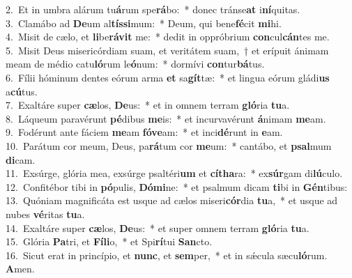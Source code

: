 {2.~}Et in umbra alárum tu\textbf{á}rum spe\textbf{rá}bo:~* donec tránse\textbf{at} i\textbf{ní}quitas.\\
{3.~}Clamábo ad \textbf{De}um al\textbf{tís}\textbf{si}mum:~* Deum, qui bene\textbf{fé}cit \textbf{mi}hi.\\
{4.~}Misit de cælo, et \textbf{li}be\textbf{rá}\textbf{vit} me:~* dedit in oppróbrium \textbf{con}cul\textbf{cán}tes me.\\
{5.~}Misit Deus misericórdiam suam, et veritátem suam,~† et erípuit ánimam meam de médio catu\textbf{ló}rum le\textbf{ó}num:~* dormívi \textbf{con}tur\textbf{bá}tus.\\
{6.~}Fílii hóminum dentes eórum arma \textbf{et} sa\textbf{gít}tæ:~* et lingua eórum gládi\textbf{us} a\textbf{cú}tus.\\
{7.~}Exaltáre super \textbf{cæ}los, \textbf{De}us:~* et in omnem terram \textbf{gló}ria \textbf{tu}a.\\
{8.~}Láqueum paravérunt \textbf{pé}dibus \textbf{me}is:~* et incurvavérunt \textbf{á}nimam \textbf{me}am.\\
{9.~}Fodérunt ante fáciem \textbf{me}am \textbf{fó}\textbf{ve}am:~* et inci\textbf{dé}runt in \textbf{e}am.\\
{10.~}Parátum cor meum, Deus, pa\textbf{rá}tum cor \textbf{me}um:~* cantábo, et \textbf{psal}mum \textbf{di}cam.\\
{11.~}Exsúrge, glória mea, exsúrge psaltéri\textbf{um} et \textbf{cí}\textbf{tha}ra:~* ex\textbf{súr}gam di\textbf{lú}culo.\\
{12.~}Confitébor tibi in \textbf{pó}pulis, \textbf{Dó}\textbf{mi}ne:~* et psalmum dicam \textbf{ti}bi in \textbf{Gén}tibus:\\
{13.~}Quóniam magnificáta est usque ad cælos miseri\textbf{cór}dia \textbf{tu}a,~* et usque ad nubes \textbf{vé}ritas \textbf{tu}a.\\
{14.~}Exaltáre super \textbf{cæ}los, \textbf{De}us:~* et super omnem terram \textbf{gló}ria \textbf{tu}a.\\
{15.~}Glória \textbf{Pa}tri, et \textbf{Fí}\textbf{li}o,~* et Spi\textbf{rí}tui \textbf{San}cto.\\
{16.~}Sicut erat in princípio, et \textbf{nunc}, et \textbf{sem}per,~* et in sǽcula sæcu\textbf{ló}rum. \textbf{A}men.\\
